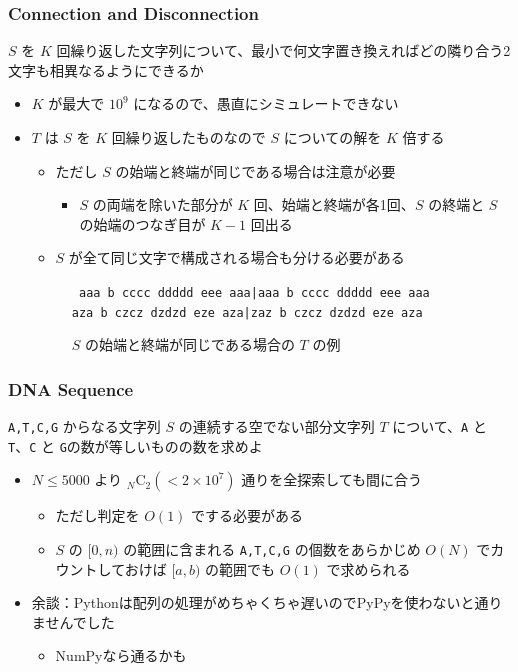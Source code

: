 \documentclass[t, aspectratio=169, dvipdfmx]{beamer}
\newcommand{\comb}[2]{{}_{#1}\mathrm{C}_{#2}}
\begin{document}
\begin{frame}[c]
\end{frame}

\begin{frame}[containsverbatim]
  \frametitle{Connection and Disconnection}
  $S$ を $K$ 回繰り返した文字列について、最小で何文字置き換えればどの隣り合う2文字も相異なるようにできるか
  \begin{itemize}
    \item $K$ が最大で $10^9$ になるので、愚直にシミュレートできない
    \item $T$ は $S$ を $K$ 回繰り返したものなので $S$ についての解を $K$ 倍する
    \begin{itemize}
      \item ただし $S$ の始端と終端が同じである場合は注意が必要
      \begin{itemize}
        \item $S$ の両端を除いた部分が $K$ 回、始端と終端が各1回、$S$ の終端と $S$ の始端のつなぎ目が $K-1$ 回出る
      \end{itemize}
      \item $S$ が全て同じ文字で構成される場合も分ける必要がある
    \end{itemize}
    \begin{figure}[b]
      \caption{$S$ の始端と終端が同じである場合の $T$ の例}
        \begin{center}\tt
          aaa b cccc ddddd eee aaa|aaa b cccc ddddd eee aaa \\
          aza b czcz dzdzd eze aza|zaz b czcz dzdzd eze aza
        \end{center}
    \end{figure}
  \end{itemize}
\end{frame}

\begin{frame}[containsverbatim]
  \frametitle{DNA Sequence}
  \verb|A,T,C,G| からなる文字列 $S$ の連続する空でない部分文字列 $T$ について、\verb|A| と \verb|T|、\verb|C| と \verb|G|の数が等しいものの数を求めよ
  \begin{itemize}
    \item $N \leq 5000$ より $\comb{N}{2}(<2 \times 10^7)$ 通りを全探索しても間に合う
    \begin{itemize}
      \item ただし判定を $O(1)$ でする必要がある
      \item $S$ の $[0,n)$ の範囲に含まれる \verb|A,T,C,G| の個数をあらかじめ $O(N)$ でカウントしておけば $[a,b)$ の範囲でも $O(1)$ で求められる
    \end{itemize}
    \item 余談：Pythonは配列の処理がめちゃくちゃ遅いのでPyPyを使わないと通りませんでした
    \begin{itemize}
      \item NumPyなら通るかも
    \end{itemize}
  \end{itemize}
\end{frame}
\end{document}
